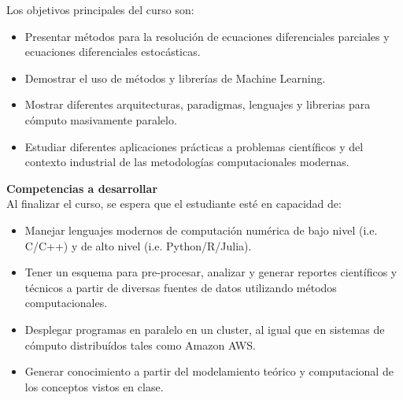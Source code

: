 \documentclass[letterpaper,10pt,onecolumn]{article}
\begin{document}
\noindent\normalsize Los objetivos principales del curso son:

\begin{itemize}

        \item Presentar m\'etodos para la resoluci\'on de ecuaciones
          diferenciales parciales y ecuaciones diferenciales
          estoc\'asticas. \\[-0.6cm]
        \item Demostrar el uso de m\'etodos y librer\'ias de Machine
          Learning. \\[-0.6cm]
        \item Mostrar diferentes arquitecturas, paradigmas, lenguajes
          y librerias para c\'omputo masivamente paralelo.
	\item Estudiar diferentes aplicaciones prácticas a problemas
          científicos y del contexto industrial de las metodologías
          computacionales modernas. \\[-0.6cm] 
\end{itemize}

\noindent\textbf{\large {} \quad Competencias a
  desarrollar}\\[-0.2cm] 


\noindent\normalsize Al finalizar el curso, se espera que el
estudiante est\'e en capacidad de: 

\begin{itemize}
\item Manejar lenguajes modernos de computación numérica de
  bajo nivel (i.e. C/C++) y de alto nivel
  (i.e. Python/R/Julia). \\[-0.6cm]
\item Tener un esquema para pre-procesar, analizar y generar
  reportes científicos y técnicos a partir de diversas fuentes
  de datos utilizando métodos computacionales. \\[-0.6cm] 
\item Desplegar programas en paralelo en un cluster, al
  igual que en sistemas de cómputo distribuídos tales como
  Amazon AWS.\\[-0.6cm] 
\item Generar conocimiento a partir del modelamiento te\'orico
  y computacional de los conceptos vistos en clase.\\[-0.2cm]  
\end{itemize}
\end{document}
